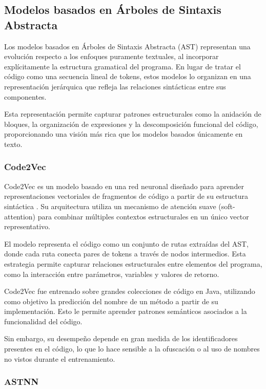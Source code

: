 \subsection{Modelos basados en Árboles de Sintaxis Abstracta}

Los modelos basados en Árboles de Sintaxis Abstracta (AST) representan una evolución respecto a los enfoques puramente textuales, al incorporar explícitamente la estructura gramatical del programa. En lugar de tratar el código como una secuencia lineal de tokens, estos modelos lo organizan en una representación jerárquica que refleja las relaciones sintácticas entre sus componentes.

Esta representación permite capturar patrones estructurales como la anidación de bloques, la organización de expresiones y la descomposición funcional del código, proporcionando una visión más rica que los modelos basados únicamente en texto.

\subsubsection{Code2Vec}

Code2Vec es un modelo basado en una red neuronal diseñado para aprender representaciones vectoriales de fragmentos de código a partir de su estructura sintáctica \cite{Alon2018Code2Vec}. Su arquitectura utiliza un mecanismo de atención suave (soft-attention) para combinar múltiples contextos estructurales en un único vector representativo.

El modelo representa el código como un conjunto de rutas extraídas del AST, donde cada ruta conecta pares de tokens a través de nodos intermedios. Esta estrategia permite capturar relaciones estructurales entre elementos del programa, como la interacción entre parámetros, variables y valores de retorno.

Code2Vec fue entrenado sobre grandes colecciones de código en Java, utilizando como objetivo la predicción del nombre de un método a partir de su implementación. Esto le permite aprender patrones semánticos asociados a la funcionalidad del código.

Sin embargo, su desempeño depende en gran medida de los identificadores presentes en el código, lo que lo hace sensible a la ofuscación o al uso de nombres no vistos durante el entrenamiento.

\subsubsection{ASTNN}

